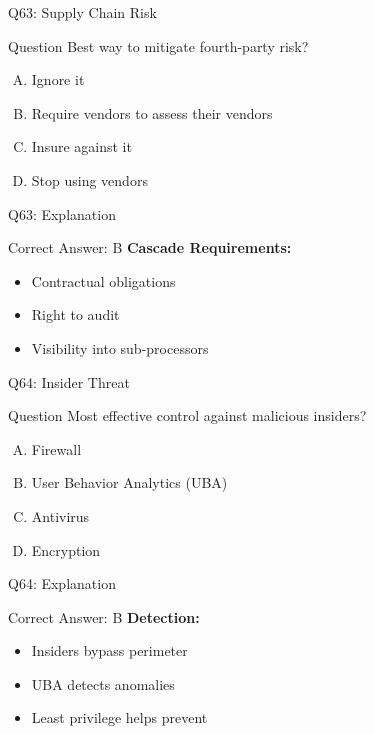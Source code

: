 \documentclass{beamer}
\begin{document}
			\begin{frame}{Q63: Supply Chain Risk}
				\begin{block}{Question}
					Best way to mitigate fourth-party risk?
				\end{block}
				\begin{enumerate}[(A)]
					\item Ignore it
					\item Require vendors to assess their vendors
					\item Insure against it
					\item Stop using vendors
				\end{enumerate}
			\end{frame}
			\begin{frame}{Q63: Explanation}
				\begin{block}{Correct Answer: B}
					\textbf{Cascade Requirements:}
					\begin{itemize}
						\item Contractual obligations
						\item Right to audit
						\item Visibility into sub-processors
					\end{itemize}
				\end{block}
			\end{frame}
			
			\begin{frame}{Q64: Insider Threat}
				\begin{block}{Question}
					Most effective control against malicious insiders?
				\end{block}
				\begin{enumerate}[(A)]
					\item Firewall
					\item User Behavior Analytics (UBA)
					\item Antivirus
					\item Encryption
				\end{enumerate}
			\end{frame}
			\begin{frame}{Q64: Explanation}
				\begin{block}{Correct Answer: B}
					\textbf{Detection:}
					\begin{itemize}
						\item Insiders bypass perimeter
						\item UBA detects anomalies
						\item Least privilege helps prevent
					\end{itemize}
				\end{block}
			\end{frame}
			
\end{document}
